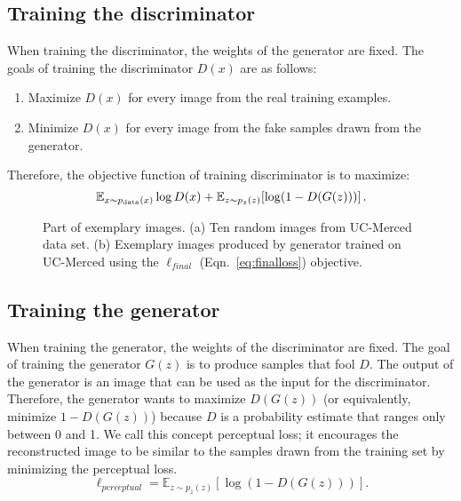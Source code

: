 \documentclass[journal]{IEEEtran}
\begin{document}
\subsection{Training the discriminator}
When training the discriminator, the weights of the generator are fixed. The goals of training the discriminator $D(x)$ are as follows:

\begin{enumerate}
	\item Maximize $D(x)$ for every image from the real training examples.
	\item Minimize $D(x)$ for every image from the fake samples drawn from the generator.
\end{enumerate}

Therefore, the objective function of training discriminator is to maximize:
\begin{equation}{\mathbb E}_{x\sim p_{\rm data}(x)} \log D(x) +
{\mathbb E}_{z\sim p_z(z)}[\log (1-D(G(z)))] \,.
\label{eq:minmax}
\end{equation}


\begin{figure*} 
	\centering
	\hfill
	
	\caption{Part of exemplary images. (a) Ten random images from UC-Merced data set. (b) Exemplary images produced by generator trained on UC-Merced using the $\ell _{final}$ (Eqn.~\ref{eq:finalloss}) objective.}
	\label{ucland} 
	\vspace{-2mm}
\end{figure*}
\vspace{-1em}
\subsection{Training the generator}
When training the generator, the weights of the discriminator are fixed. The goal of training the generator $G(z)$ is to produce samples that fool $D$. The output of the generator is an image that can be used as the input for the discriminator. Therefore, the generator wants to maximize $D(G(z))$ (or equivalently, minimize $1-D(G(z))$) because $D$ is a probability estimate that ranges only between 0 and 1. We call this concept perceptual loss; it encourages the reconstructed image to be similar to the samples drawn from the training set by minimizing the perceptual loss.
\begin{equation}
\ell_{perceptual}={\mathbb E}_{{z}\sim p_z({z})}[\log (1-D(G({z})))].
\label{eq:perceptual}
\end{equation}
\end{document}
